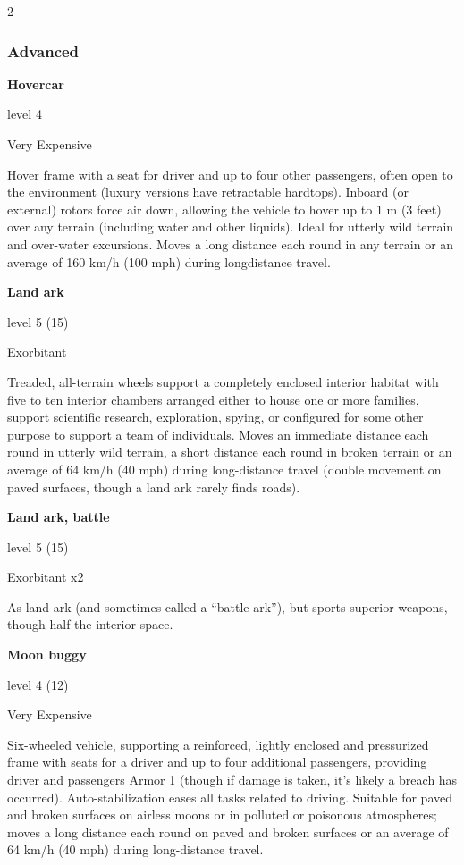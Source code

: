 \begin{multicols}{2}
\subsubsection{Advanced}

\textbf{Hovercar} 

level 4 

Very Expensive 

Hover frame with a seat for driver and up to four other passengers, often open to the environment (luxury versions have retractable hardtops). Inboard (or external) rotors force air down, allowing the vehicle to hover up to 1 m (3 feet) over any terrain (including water and other liquids). Ideal for utterly wild terrain and over-water excursions. Moves a long distance each round in any terrain or an average of 160 km/h (100 mph) during longdistance travel. 

\textbf{Land ark} 

level 5 (15)

Exorbitant 

Treaded, all-terrain wheels support a completely enclosed interior habitat with five to ten interior chambers arranged either to house one or more families, support scientific research, exploration, spying, or configured for some other purpose to support a team of individuals. Moves an immediate distance each round in utterly wild terrain, a short distance each round in broken terrain or an average of 64 km/h (40 mph) during long-distance travel (double movement on paved surfaces, though a land ark rarely finds roads). 

\textbf{Land ark, battle} 

level 5 (15) 

Exorbitant x2 

As land ark (and sometimes called a “battle ark”), but sports superior weapons, though half the interior space. 

\textbf{Moon buggy} 

level 4 (12) 

Very Expensive 

Six-wheeled vehicle, supporting a reinforced, lightly enclosed and pressurized frame with seats for a driver and up to four additional passengers, providing driver and passengers Armor 1 (though if damage is taken, it’s likely a breach has occurred). Auto-stabilization eases all tasks related to driving. Suitable for paved and broken surfaces on airless moons or in polluted or poisonous atmospheres; moves a long distance each round on paved and broken surfaces or an average of 64 km/h (40 mph) during long-distance travel.


\end{multicols}
